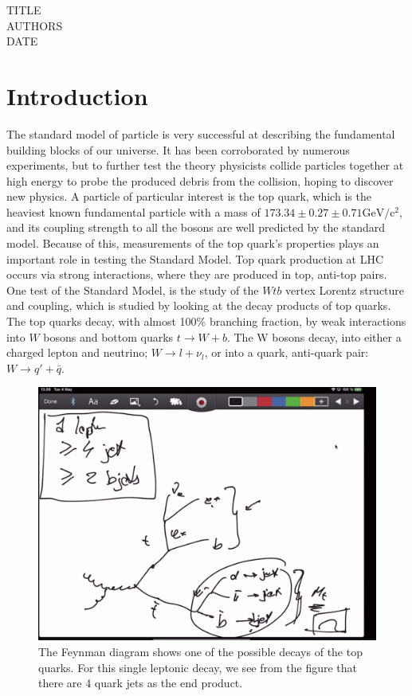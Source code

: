 \documentclass[11pt,a4paper]{article}
\begin{document}
TITLE\\
AUTHORS\\
DATE

\cleardoublepage{}
\begin{abstract}
  
\end{abstract}
\cleardoublepage{}
\tableofcontents{}
\section{Introduction}
The standard model of particle is very successful at describing the fundamental
building blocks of our universe. It has been corroborated by numerous
experiments, but to further test the theory physicists collide particles
together at high energy to probe the produced debris from the collision, hoping
to discover new physics. A particle of particular interest is the top quark,
which is the heaviest known fundamental particle with a mass of
$173.34 \pm 0.27 \pm 0.71 \mathrm{GeV/c^2}$, and its coupling strength to all
the bosons are well predicted by the standard model. Because of this,
measurements of the top quark's properties plays an important role in testing
the Standard Model. Top quark production at LHC occurs via strong interactions,
where they are produced in top, anti-top pairs. One test of the Standard Model,
is the study of the $Wtb$ vertex Lorentz structure and coupling, which is
studied by looking at the decay products of top quarks. The top quarks decay,
with almost 100\% branching fraction, by weak interactions into $W$ bosons and
bottom quarks $t \rightarrow W + b$. The W bosons decay, into either a charged lepton and
neutrino; $W \rightarrow l + \nu_l$, or into a quark, anti-quark pair: $W \rightarrow q' + \bar{q}$.\\

\begin{figure}[H]
	\includegraphics[width=\linewidth]{Placeholder_FeynmanDiagram.png}
	\caption{The Feynman diagram shows one of the possible decays of the top
      quarks. For this single leptonic decay, we see from the figure that there
      are 4 quark jets as the end product.}
	\label{fig_feynmandiagram}
\end{figure}
\end{document}
